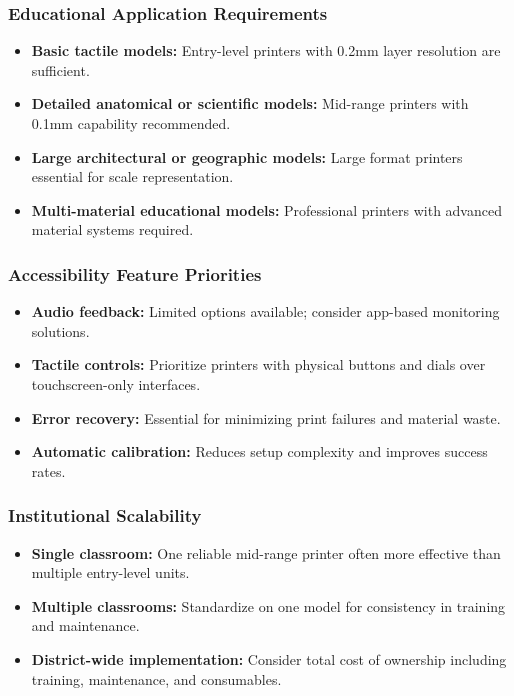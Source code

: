 \subsubsection{Educational Application Requirements}
\begin{itemize}
	\item \textbf{Basic tactile models:} Entry-level printers with 0.2mm layer resolution are sufficient.
	\item \textbf{Detailed anatomical or scientific models:} Mid-range printers with 0.1mm capability recommended.
	\item \textbf{Large architectural or geographic models:} Large format printers essential for scale representation.
	\item \textbf{Multi-material educational models:} Professional printers with advanced material systems required.
\end{itemize}

\subsubsection{Accessibility Feature Priorities}
\begin{itemize}
	\item \textbf{Audio feedback:} Limited options available; consider app-based monitoring solutions.
	\item \textbf{Tactile controls:} Prioritize printers with physical buttons and dials over touchscreen-only interfaces.
	\item \textbf{Error recovery:} Essential for minimizing print failures and material waste.
	\item \textbf{Automatic calibration:} Reduces setup complexity and improves success rates.
\end{itemize}

\subsubsection{Institutional Scalability}
\begin{itemize}
	\item \textbf{Single classroom:} One reliable mid-range printer often more effective than multiple entry-level units.
	\item \textbf{Multiple classrooms:} Standardize on one model for consistency in training and maintenance.
	\item \textbf{District-wide implementation:} Consider total cost of ownership including training, maintenance, and consumables.
\end{itemize}

